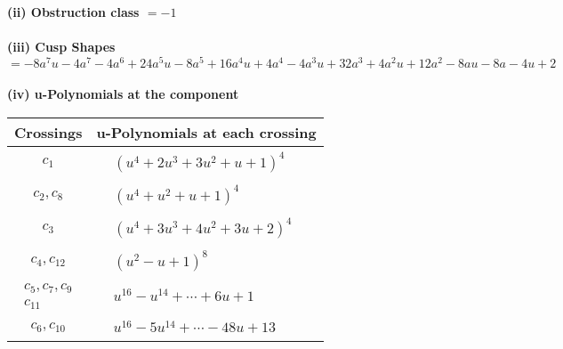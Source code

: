 \documentclass[1p]{elsarticle_modified}
\theoremstyle{definition}
\begin{document}
\flushleft \textbf{(ii) Obstruction class $= -1$}\\~\\
\flushleft \textbf{(iii) Cusp Shapes $= -8 a^7 u-4 a^7-4 a^6+24 a^5 u-8 a^5+16 a^4 u+4 a^4-4 a^3 u+32 a^3+4 a^2 u+12 a^2-8 a u-8 a-4 u+2$}\\~\\
\newpage\renewcommand{\arraystretch}{1}
\flushleft \textbf{(iv) u-Polynomials at the component}\newline \\
\begin{tabular}{m{50pt}|m{274pt}}
Crossings & \hspace{64pt}u-Polynomials at each crossing \\
\hline $$\begin{aligned}c_{1}\end{aligned}$$&$\begin{aligned}
&(u^4+2 u^3+3 u^2+u+1)^4
\end{aligned}$\\
\hline $$\begin{aligned}c_{2},c_{8}\end{aligned}$$&$\begin{aligned}
&(u^4+u^2+u+1)^4
\end{aligned}$\\
\hline $$\begin{aligned}c_{3}\end{aligned}$$&$\begin{aligned}
&(u^4+3 u^3+4 u^2+3 u+2)^4
\end{aligned}$\\
\hline $$\begin{aligned}c_{4},c_{12}\end{aligned}$$&$\begin{aligned}
&(u^2- u+1)^8
\end{aligned}$\\
\hline $$\begin{aligned}c_{5},c_{7},c_{9}\\c_{11}\end{aligned}$$&$\begin{aligned}
&u^{16}- u^{14}+\cdots+6 u+1
\end{aligned}$\\
\hline $$\begin{aligned}c_{6},c_{10}\end{aligned}$$&$\begin{aligned}
&u^{16}-5 u^{14}+\cdots-48 u+13
\end{aligned}$\\
\hline
\end{tabular}\\~\\
\end{document}
